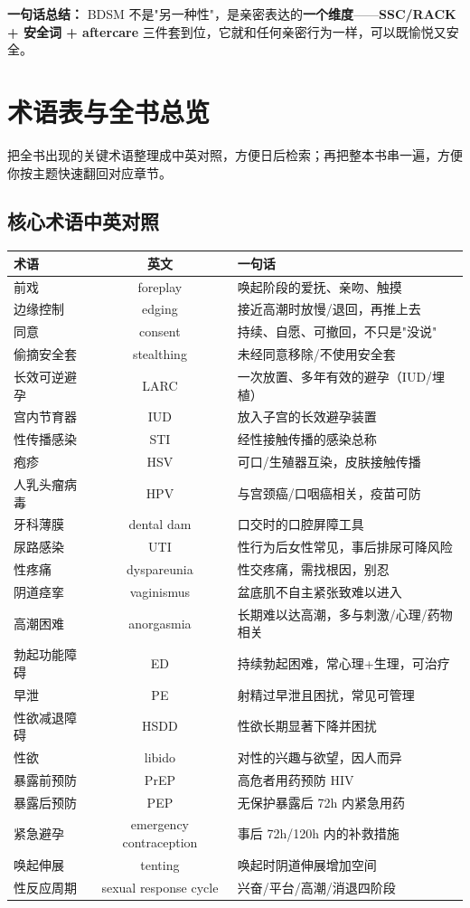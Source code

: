 \documentclass[12pt,UTF8,openany]{ctexbook}
\begin{document}
\vspace{1em}
\noindent\textbf{一句话总结：} BDSM 不是"另一种性"，是亲密表达的\textbf{一个维度}——\textbf{SSC/RACK + 安全词 + aftercare} 三件套到位，它就和任何亲密行为一样，可以既愉悦又安全。

\chapter{术语表与全书总览}
\label{chap:glossary}

把全书出现的关键术语整理成中英对照，方便日后检索；再把整本书串一遍，方便你按主题快速翻回对应章节。

\section{核心术语中英对照}

\begin{tabularx}{\textwidth}{l C X}
\toprule
术语 & 英文 & 一句话 \\
\midrule
前戏 & foreplay & 唤起阶段的爱抚、亲吻、触摸 \\
边缘控制 & edging & 接近高潮时放慢/退回，再推上去 \\
同意 & consent & 持续、自愿、可撤回，不只是"没说" \\
偷摘安全套 & stealthing & 未经同意移除/不使用安全套 \\
长效可逆避孕 & LARC & 一次放置、多年有效的避孕（IUD/埋植） \\
宫内节育器 & IUD & 放入子宫的长效避孕装置 \\
性传播感染 & STI & 经性接触传播的感染总称 \\
疱疹 & HSV & 可口/生殖器互染，皮肤接触传播 \\
人乳头瘤病毒 & HPV & 与宫颈癌/口咽癌相关，疫苗可防 \\
牙科薄膜 & dental dam & 口交时的口腔屏障工具 \\
尿路感染 & UTI & 性行为后女性常见，事后排尿可降风险 \\
性疼痛 & dyspareunia & 性交疼痛，需找根因，别忍 \\
阴道痉挛 & vaginismus & 盆底肌不自主紧张致难以进入 \\
高潮困难 & anorgasmia & 长期难以达高潮，多与刺激/心理/药物相关 \\
勃起功能障碍 & ED & 持续勃起困难，常心理+生理，可治疗 \\
早泄 & PE & 射精过早泄且困扰，常见可管理 \\
性欲减退障碍 & HSDD & 性欲长期显著下降并困扰 \\
性欲 & libido & 对性的兴趣与欲望，因人而异 \\
暴露前预防 & PrEP & 高危者用药预防 HIV \\
暴露后预防 & PEP & 无保护暴露后 72h 内紧急用药 \\
紧急避孕 & emergency contraception & 事后 72h/120h 内的补救措施 \\
唤起伸展 & tenting & 唤起时阴道伸展增加空间 \\
性反应周期 & sexual response cycle & 兴奋/平台/高潮/消退四阶段 \\
\bottomrule
\end{tabularx}
\end{document}
